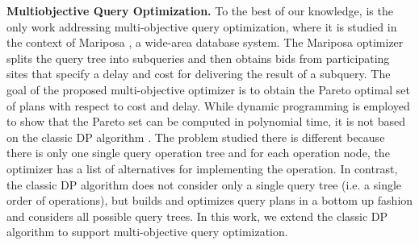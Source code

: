 \textbf{Multiobjective Query Optimization.} To the best of our
knowledge, \cite{papadimitriou_multiobjective_2001} is the only work
addressing multi-objective query optimization, where it is studied
in the context of Mariposa \cite{stonebraker_mariposa:_1996}, a
wide-area database system. The Mariposa optimizer splits the query
tree into subqueries and then obtains bids from participating sites
that specify a delay and cost for delivering the result of a
subquery. The goal of the proposed multi-objective optimizer
\cite{papadimitriou_multiobjective_2001} is to obtain the Pareto
optimal set of plans with respect to cost and delay. While dynamic
programming is employed to show that the Pareto set can be
computed in polynomial time, it is not based on the classic DP
algorithm \cite{selinger_access_1979}. The problem studied there is different
because there is only one single query operation tree and for each operation
node, the optimizer has a list of alternatives for implementing
the operation. In contrast, the classic DP algorithm does not consider
only a single query tree (i.e. a single order of operations), but
builds and optimizes query plans in a bottom up fashion and considers all
possible query trees. In this work, we extend the classic DP algorithm to
support multi-objective query optimization.












